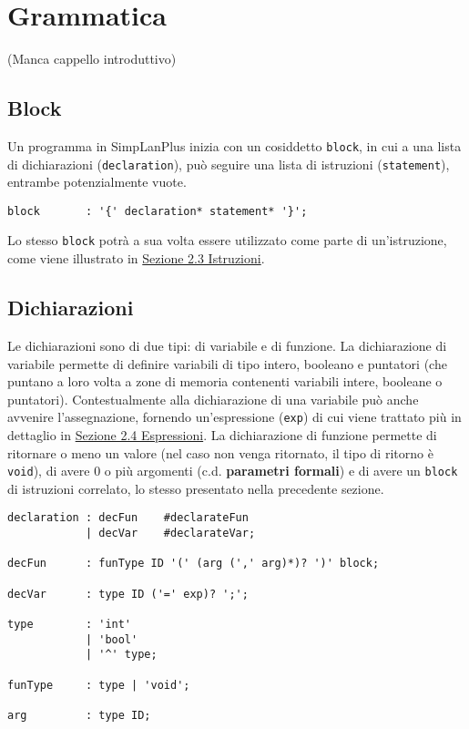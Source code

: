 \documentclass[../report.tex]{subfiles}
\begin{document}
\chapter{Grammatica}\label{c:grammatica}
(Manca cappello introduttivo)

\section{Block}\label{s:block}
Un programma in SimpLanPlus inizia con un cosiddetto \verb|block|, in cui a una lista di dichiarazioni (\verb|declaration|), può seguire una lista di istruzioni (\verb|statement|), entrambe potenzialmente vuote.
\begin{lstlisting}[style=antlr]
block       : '{' declaration* statement* '}';
\end{lstlisting}
Lo stesso \verb|block| potrà a sua volta essere utilizzato come parte di un'istruzione, come viene illustrato in \hyperref[s:istruzioni]{Sezione 2.3 Istruzioni}.

\section{Dichiarazioni}\label{s:dichiarazioni}
Le dichiarazioni sono di due tipi: di variabile e di funzione. La dichiarazione di variabile permette di definire variabili di tipo intero, booleano e puntatori (che puntano a loro volta a zone di memoria contenenti variabili intere, booleane o puntatori). Contestualmente alla dichiarazione di una variabile può anche avvenire l'assegnazione, fornendo un'espressione (\verb|exp|) di cui viene trattato più in dettaglio in \hyperref[s:espressioni]{Sezione 2.4 Espressioni}.
La dichiarazione di funzione permette di ritornare o meno un valore (nel caso non venga ritornato, il tipo di ritorno è \verb|void|), di avere 0 o più argomenti (c.d. \textbf{parametri formali}) e di avere un \verb|block| di istruzioni correlato, lo stesso presentato nella precedente sezione.
\begin{lstlisting}[style=antlr]
declaration : decFun    #declarateFun
            | decVar    #declarateVar;

decFun      : funType ID '(' (arg (',' arg)*)? ')' block;

decVar      : type ID ('=' exp)? ';';

type        : 'int'
            | 'bool'
            | '^' type;

funType     : type | 'void';

arg         : type ID;
\end{lstlisting}
\end{document}
